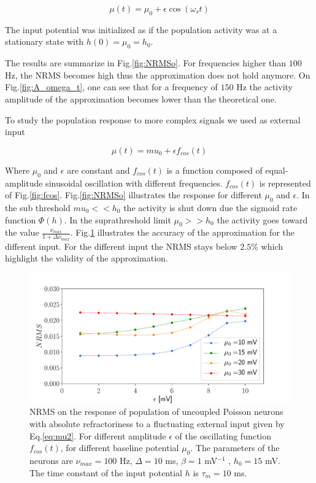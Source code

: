 \documentclass[12pt,twoside]{report}
\begin{document}
\begin{equation}
\label{eq:mut}
\mu(t)=\mu_0 + \epsilon \cos(\omega_st)
\end{equation}

The input potential was initialized as if the population activity was at a stationary state with $h(0)=\mu_0=h_0$. 

The results are summarize in Fig.\ref{fig:NRMSo}. For frequencies higher than $100$ Hz, the NRMS becomes high thus the approximation does not hold anymore. On Fig.\ref{fig:A_omega_t}, one can see that for a frequency of $150$ Hz the activity amplitude of the approximation becomes lower than the theoretical one.

To study the population response to more complex signals we used as external input

\begin{equation}
\label{eq:mu2}
\mu(t)=mu_0+\epsilon f_{cos}(t)
\end{equation} 


Where $\mu_0$ and $\epsilon$ are constant and $f_{cos}(t)$  is a function composed of equal-amplitude sinusoidal oscillation with different frequencies. $f_{cos}(t)$ is represented of Fig.\ref{fig:fcos}. Fig.\ref{fig:NRMSo} illustrates the response for different $\mu_0$ and $\epsilon$. In the sub threshold $mu_0<<h_0$ the activity is shut down due the sigmoid rate function $\Phi(h)$. In the suprathreshold limit $\mu_0>>h_0$ the activity goes toward the value $\frac{\nu_{max}}{1+\Delta\nu_{max}}$. Fig.\ref{fig:NRMSe} illustrates the accuracy of the approximation for the different input. For the different input the NRMS stays below $2.5\%$ which highlight the validity of the approximation.

\begin{figure}[h!]
	\centering
	\includegraphics[width=0.8\linewidth]{NRMSe.pdf}
	\caption{NRMS on the response of population of uncoupled Poisson neurons with absolute refractoriness to a fluctuating external input given by Eq.\eqref{eq:mu2}. For different amplitude $\epsilon$ of the oscillating function $f_{cos}(t)$, for different baseline potential $\mu_0$. The parameters of the neurons are $\nu_{max}=100$ Hz, $\Delta=10$ ms, $\beta=1$ mV$^{-1}$ , $h_0=15$ mV. The time constant of the input potential $h$ is $\tau_m=10$ ms.
	}
	\label{fig:NRMSe}
\end{figure}
\end{document}
